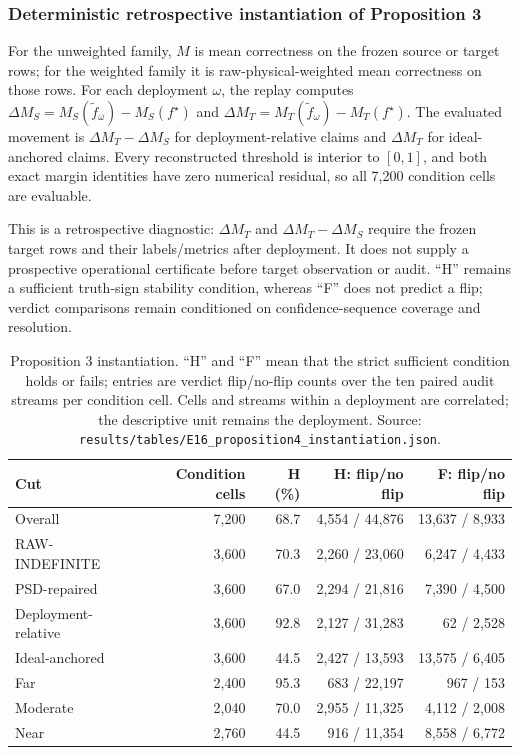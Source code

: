 \documentclass[11pt,a4paper]{article}
\begin{document}
\subsubsection{Deterministic retrospective instantiation of Proposition 3}
\label{sec:prop4-instantiation}

For the unweighted family, $M$ is mean correctness on the frozen source or
target rows; for the weighted family it is raw-physical-weighted mean
correctness on those rows. For each deployment $\omega$, the replay computes
$\Delta M_S=M_S(\tilde f_\omega)-M_S(f^\star)$ and
$\Delta M_T=M_T(\tilde f_\omega)-M_T(f^\star)$. The evaluated movement is
$\Delta M_T-\Delta M_S$ for deployment-relative claims and $\Delta M_T$ for
ideal-anchored claims. Every reconstructed threshold is interior to $[0,1]$,
and both exact margin identities have zero numerical residual, so all 7,200
condition cells are evaluable.

This is a retrospective diagnostic: $\Delta M_T$ and
$\Delta M_T-\Delta M_S$ require the frozen target rows and their labels/metrics
after deployment. It does not supply a prospective operational certificate
before target observation or audit. ``H'' remains a sufficient truth-sign
stability condition, whereas ``F'' does not predict a flip; verdict comparisons
remain conditioned on confidence-sequence coverage and resolution.

\begin{table}[H]
\centering
\small
\setlength{\tabcolsep}{4pt}
\caption{Proposition 3 instantiation. ``H'' and ``F'' mean that the strict
sufficient condition holds or fails; entries are verdict flip/no-flip counts
over the ten paired audit streams per condition cell. Cells and streams within
a deployment are correlated; the descriptive unit remains the deployment.
Source: \texttt{results/tables/E16\_proposition4\_instantiation.json}.}
\label{tab:prop4-instantiation}
\begin{tabular}{lrrrr}
\toprule
Cut & Condition cells & H (\%) & H: flip/no flip & F: flip/no flip \\
\midrule
Overall & 7,200 & 68.7 & 4,554 / 44,876 & 13,637 / 8,933 \\
RAW-INDEFINITE & 3,600 & 70.3 & 2,260 / 23,060 & 6,247 / 4,433 \\
PSD-repaired & 3,600 & 67.0 & 2,294 / 21,816 & 7,390 / 4,500 \\
Deployment-relative & 3,600 & 92.8 & 2,127 / 31,283 & 62 / 2,528 \\
Ideal-anchored & 3,600 & 44.5 & 2,427 / 13,593 & 13,575 / 6,405 \\
Far & 2,400 & 95.3 & 683 / 22,197 & 967 / 153 \\
Moderate & 2,040 & 70.0 & 2,955 / 11,325 & 4,112 / 2,008 \\
Near & 2,760 & 44.5 & 916 / 11,354 & 8,558 / 6,772 \\
\bottomrule
\end{tabular}
\end{table}
\end{document}
